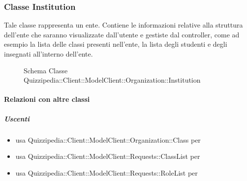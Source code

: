 \subsubsection{Classe Institution}
Tale classe rappresenta un ente. Contiene le informazioni relative alla struttura dell'ente che saranno visualizzate dall'utente e gestiste dal controller, come ad esempio la lista delle classi presenti nell'ente, la lista degli studenti e degli insegnati all'interno dell'ente.
\begin{figure}[H]
\centering
\noindent{}
\caption[Schema Classe Institution]{Schema Classe Quizzipedia::Client::ModelClient::Organization::Institution}
\end{figure}
\paragraph{Relazioni con altre classi}
\subparagraph{Uscenti}
\begin{itemize}
\item usa Quizzipedia::Client::ModelClient::Organization::Class per 
\item usa Quizzipedia::Client::ModelClient::Requests::ClassList per 
\item usa Quizzipedia::Client::ModelClient::Requests::RoleList per 
\end{itemize}
